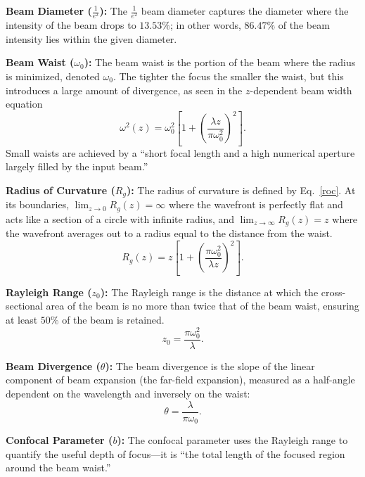 \documentclass[11pt, letterpaper]{article}
\begin{document}
\textbf{Beam Diameter ($\tfrac{1}{e^2}$):} The $\tfrac{1}{e^2}$ beam diameter captures the diameter where the intensity of the beam drops to $13.53\%$; in other words, $86.47\%$ of the beam intensity lies within the given diameter.



\textbf{Beam Waist ($\omega_0$):} The beam waist is the portion of the beam where the radius is minimized, denoted $\omega_0$. The tighter the focus the smaller the waist, but this introduces a large amount of divergence, as seen in the $z$-dependent beam width equation
\begin{equation}\label{omega}
    \omega^2(z)=\omega_0^2\left[1+\left(\frac{\lambda z}{\pi \omega_0^2}\right)^2\right].
\end{equation}
Small waists are achieved by a ``short focal length and a high numerical aperture largely filled by the input beam.''\cite{RPw_0}


\textbf{Radius of Curvature ($R_g$):} The radius of curvature is defined by Eq.~\eqref{roc}. At its boundaries, $\lim_{z\to 0} R_g(z)=\infty$ where the wavefront is perfectly flat and acts like a section of a circle with infinite radius, and $\lim_{z\to\infty}R_g(z)=z$ where the wavefront averages out to a radius equal to the distance from the waist.
\begin{equation}\label{roc}
R_g(z) = z\left[1 + \left(\frac{\pi \omega_0^2}{\lambda z}\right)^2\right].
\end{equation}

\textbf{Rayleigh Range ($z_0$):} The Rayleigh range is the distance at which the cross-sectional area of the beam is no more than twice that of the beam waist, ensuring at least $50\%$ of the beam is retained.\cite{RPz_0}
\begin{equation}\label{z_0}
z_0=\frac{\pi \omega_0^2}{\lambda}.
\end{equation}

\textbf{Beam Divergence ($\theta$):} The beam divergence is the slope of the linear component of beam expansion (the far-field expansion), measured as a half-angle dependent on the wavelength and inversely on the waist:
\begin{equation}\label{theta}
    \theta=\frac{\lambda}{\pi \omega_0}.
\end{equation}


\textbf{Confocal Parameter ($b$):} The confocal parameter uses the Rayleigh range to quantify the useful depth of focus---it is ``the total length of the focused region around the beam waist.''\cite{RPz_0}
\end{document}
